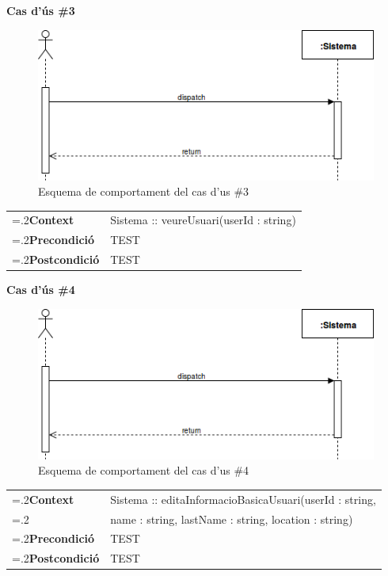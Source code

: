 \clearpage
\noindent\textbf{\large Cas d'ús \#3}\\
\begin{figure}[H]
\centering
\includegraphics[scale=0.6]{Figures/casdus_00.png}
\caption{Esquema de comportament del cas d'us \#3}
\end{figure}
\begin{table}[h]
\noindent
\begin{tabularx}{\linewidth}{
>{\hsize=.2\hsize}X%
>{\hsize=0.8\hsize}X%
}
\textbf{Context} 		& Sistema :: veureUsuari(userId : string) \\
\textbf{Precondició} 	& TEST \\
\textbf{Postcondició}	& TEST \\
\end{tabularx}
\label{}
\end{table}

\noindent\textbf{\large Cas d'ús \#4}\\
\begin{figure}[H]
\centering
\includegraphics[scale=0.6]{Figures/casdus_00.png}
\caption{Esquema de comportament del cas d'us \#4}
\end{figure}
\begin{table}[h]
\noindent
\begin{tabularx}{\linewidth}{
>{\hsize=.2\hsize}X%
>{\hsize=0.8\hsize}X%
}
\textbf{Context} 		& Sistema :: editaInformacioBasicaUsuari(userId : string, \\
						& name : string, lastName : string, location : string) \\
\textbf{Precondició} 	& TEST \\
\textbf{Postcondició}	& TEST \\
\end{tabularx}
\label{}
\end{table}

